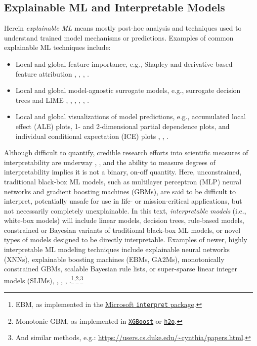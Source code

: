 \documentclass{article}
\begin{document}
\subsection{Explainable ML and Interpretable Models }

Herein \textit{explainable ML} means mostly post-hoc analysis and techniques used to understand trained model mechanisms or predictions. Examples of common explainable ML techniques include:

\begin{itemize}
\item Local and global feature importance, e.g., Shapley and derivative-based feature attribution \cite{grad_attr} \cite{keinan2004fair}, \cite{shapley}, \cite{shapley1988shapley}, \cite{kononenko2010efficient}.
\item Local and global model-agnostic surrogate models, e.g., surrogate decision trees and LIME \cite{dt_surrogate2}, \cite{viper}, \cite{dt_surrogate1}, \cite{lime-sup}, \cite{lime}, \cite{wf_xnn}.
\item Local and global visualizations of model predictions, e.g., accumulated local effect (ALE) plots, 1- and 2-dimensional partial dependence plots, and individual conditional expectation (ICE) plots \cite{ale_plot}, \cite{esl}, \cite{ice_plots}.
\end{itemize}

Although difficult to quantify, credible research efforts into scientific measures of interpretability are underway \cite{friedler2019assessing}, \cite{molnar2019quantifying}, and the ability to measure degrees of interpretability implies it is not a binary, on-off quantity. Here, unconstrained, traditional black-box ML models, such as multilayer perceptron (MLP) neural networks and gradient boosting machines (GBMs), are said to be difficult to interpret, potentially unsafe for use in life- or mission-critical applications, but not necessarily completely unexplainable. In this text, \textit{interpretable models} (i.e., white-box models) will include linear models, decision trees, rule-based models, constrained or Bayesian variants of traditional black-box ML models, or novel types of models designed to be directly interpretable. Examples of newer, highly interpretable ML modeling techniques include explainable neural networks (XNNs), explainable boosting machines (EBMs, GA2Ms), monotonically constrained GBMs, scalable Bayesian rule lists, or super-sparse linear integer models (SLIMs), \cite{ga2m}, \cite{slim}, \cite{wf_xnn}, \cite{sbrl}.\footnote{\scriptsize{EBM, as implemented in the \href{https://github.com/microsoft/interpret}{Microsoft \texttt{interpret} package}.}}\textsuperscript{,}\footnote{\scriptsize{Monotonic GBM, as implemented in \href{https://xgboost.readthedocs.io/en/latest/tutorials/monotonic.html}{\texttt{XGBoost}} or \href{https://github.com/h2oai/h2o-3/blob/master/h2o-py/demos/H2O_tutorial_gbm_monotonicity.ipynb}{\texttt{h2o}}.}}\textsuperscript{,}\footnote{\scriptsize{And similar methods, e.g.: \url{https://users.cs.duke.edu/~cynthia/papers.html}}.}
\end{document}
